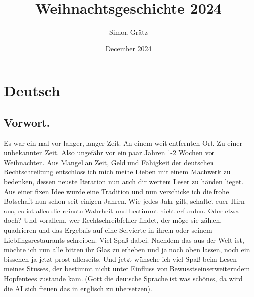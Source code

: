 \documentclass{article}
\title{Weihnachtsgeschichte 2024}
\author{Simon Grätz}
\date{December 2024}
\begin{document}
\maketitle
\tableofcontents
\section{Deutsch}
\subsection{Vorwort.}
Es war ein mal vor langer, langer Zeit. An einem weit entfernten Ort. Zu
einer unbekannten Zeit. Also ungefähr vor ein paar Jahren 1-2 Wochen vor Weihnachten. Aus Mangel an Zeit, Geld
und Fähigkeit der deutschen Rechtschreibung entschloss ich mich meine Lieben mit einem Machwerk zu bedenken,
dessen neuste Iteration nun auch dir wertem Leser zu händen lieget. Aus einer fixen Idee wurde eine Tradition
und nun verschicke ich die frohe Botschaft nun schon seit einigen Jahren. Wie jedes Jahr gilt, schaltet euer
Hirn aus, es ist alles die reinste Wahrheit und bestimmt nicht erfunden. Oder etwa doch? Und vorallem, wer
Rechtschreibfehler findet, der möge sie zählen, quadrieren und das Ergebnis auf eine Servierte in ihrem oder
seinem Lieblingsrestaurants schreiben. Viel Spaß dabei. Nachdem das aus der Welt ist, möchte ich nun alle bitten
ihr Glas zu erheben und ja noch oben lassen, noch ein bisschen ja jetzt prost allerseits. Und jetzt wünsche ich
viel Spaß beim Lesen meines Stusses, der bestimmt nicht unter Einfluss von Bewusstseinserweiterndem Hopfentees
zustande kam. (Gott die deutsche Sprache ist was schönes, da wird die AI sich freuen das in englisch zu
übersetzen). 
\end{document}
